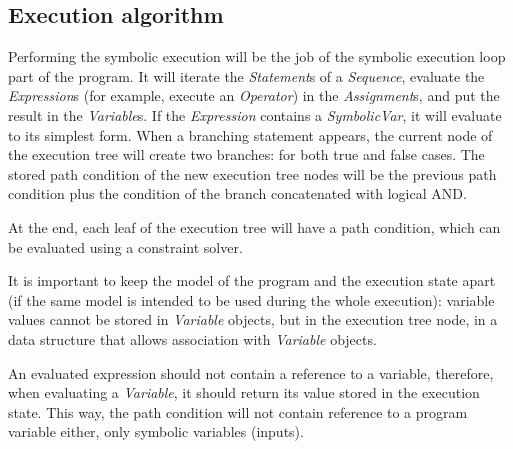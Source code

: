 \subsection{Execution algorithm}

Performing the symbolic execution will be the job of the symbolic execution loop part of the program. It will iterate the \textit{Statement}s of a \textit{Sequence}, evaluate the \textit{Expression}s (for example, execute an \textit{Operator}) in the \textit{Assignment}s, and put the result in the \textit{Variable}s. If the \textit{Expression} contains a \textit{SymbolicVar}, it will evaluate to its simplest form. When a branching statement appears, the current node of the execution tree will create two branches: for both true and false cases. The stored path condition of the new execution tree nodes will be the previous path condition plus the condition of the branch concatenated with logical AND.

At the end, each leaf of the execution tree will have a path condition, which can be evaluated using a constraint solver.

It is important to keep the model of the program and the execution state apart (if the same model is intended to be used during the whole execution): variable values cannot be stored in \textit{Variable} objects, but in the execution tree node, in a data structure that allows association with \textit{Variable} objects. 

An evaluated expression should not contain a reference to a variable, therefore, when evaluating a \textit{Variable}, it should return its value stored in the execution state. This way, the path condition will not contain reference to a program variable either, only symbolic variables (inputs).
